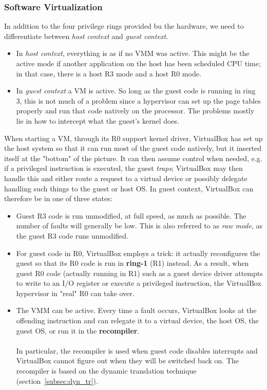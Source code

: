 \documentclass[a4paper, 12pt, titlepage]{report}
\begin{document}
\subsubsection{Software Virtualization}
In addition to the four privilege rings provided bu the hardware, we need to differentiate between \textit{host context} and \textit{guest context}.
\begin{itemize}
\item In \textit{host context}, everything is as if no VMM was active. This might be the active mode if another application on the host has been scheduled CPU time; in that case, there is a host R3 mode and a host R0 mode.
\item In \textit{guest context} a VM is active. So long as the guest code is running in ring 3, this is not much of a problem since a hypervisor can set up the page tables properly and run that code natively on the processor. The problems mostly lie in how to intercept what the guest's kernel does.
\end{itemize}
When starting a VM, through its R0 support kernel driver, VirtualBox has set up the host system so that it can run most of the guest code natively, but it inserted itself at the "bottom" of the picture. It can then assume control when needed, e.g. if a privileged instruction is executed, the guest \textit{traps}; VirtualBox may then handle this and either route a request to a virtual device or possibly delegate handling such things to the guest or host OS. In guest context, VirtualBox can therefore be in one of three states:
\begin{itemize}
\item Guest R3 code is run unmodified, at full speed, as much as possible. The number of faults will generally be low. This is also referred to as \textit{raw mode}, as the guest R3 code runs unmodified.
\item For guest code in R0, VirtualBox employs a trick: it actually reconfigures the guest so that its R0 code is run in \textbf{ring-1} (R1) instead. As a result, when guest R0 code (actually running in R1) such as a guest device driver attempts to write to an I/O register or execute a privileged instruction, the VirtualBox hypervisor in "real" R0 can take over.
\item The VMM can be active. Every time a fault occurs, VirtualBox looks at the offending instruction and can relegate it to a virtual device, the host OS, the guest OS, or run it in the \textbf{recompiler}.
\\
\\
In particular, the recompiler is used when guest code disables interrupts and VirtualBox cannot figure out when they will be switched back on. The recompiler is based on the dynamic translation technique (section~\ref{subsec:dyn_tr}).
\end{itemize}
\end{document}
